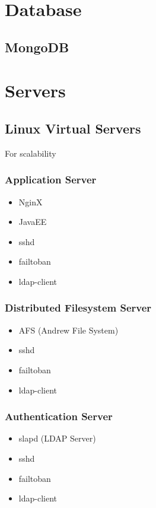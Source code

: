 
\section{Database}
	\subsection{MongoDB}
		
\section{Servers}
	\subsection{Linux Virtual Servers}
		For scalability
		\subsubsection{Application Server}
		\begin{itemize}
			\item NginX
			\item JavaEE
			\item sshd
			\item failtoban
			\item ldap-client
		\end{itemize}
		\subsubsection{Distributed Filesystem Server}
		\begin{itemize}
			\item AFS (Andrew File System)
			\item sshd
			\item failtoban
			\item ldap-client
		\end{itemize}
		\subsubsection{Authentication Server}
		\begin{itemize}
			\item slapd (LDAP Server)
			\item sshd
			\item failtoban
			\item ldap-client
		\end{itemize}		
